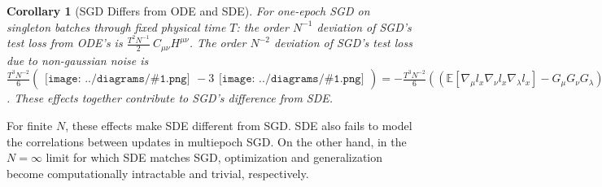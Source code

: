 \documentclass{article}
\newtheorem{cor}{Corollary}
\newcommand{\expct}[1]{\mathbb{E}\left[#1\right]}
\newcommand{\wrap}[1]{\left(#1\right)}
\newcommand{\sdia}[1]{\begin{gathered}\texttt{[image: ../diagrams/\#1.png]}\end{gathered}}
\begin{document}
        \begin{cor}[SGD Differs from ODE and SDE] \label{cor:vsode}
            For one-epoch SGD on singleton batches through fixed physical time
            $T$: the order $N^{-1}$ deviation of SGD's test loss from ODE's is
            $
                \frac{T^2 N^{-1}}{2} ~ C_{\mu\nu} H^{\mu\nu}
            $.
            The order $N^{-2}$ deviation of SGD's test loss due to non-gaussian
            noise is
            $
                \frac{T^3 N^{-2}}{6} \wrap{
                    \sdia{c(012-3)(03-13-23)}
                    -
                    3 \sdia{c(01-2-3)(03-13-23)}
                }
                =
                -
                \frac{T^3 N^{-2}}{6}  
                \wrap{
                    \wrap{
                        \expct{\nabla_\mu l_x \nabla_\nu l_x \nabla_\lambda l_x}-
                        G_\mu G_\nu G_\lambda
                    }
                    J^{\mu\nu\lambda}
                    - 
                    3
                    C_{\mu \nu} G_\lambda J^{\mu\nu\lambda}
                }
            $.
            These effects together contribute to SGD's difference from SDE.
        \end{cor}
        For finite $N$, these effects make SDE different from SGD.  SDE also
        fails to model the correlations between updates in multiepoch SGD.  On
        the other hand, in the $N=\infty$ limit for which SDE matches SGD,
        optimization and generalization become computationally intractable and
        trivial, respectively. 
    
\end{document}
